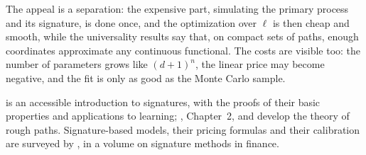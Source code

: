 
The appeal is a separation: the expensive part, simulating the primary process and its signature, is done once,
and the optimization over $\ell$ is then cheap and smooth, while the universality results say that, on compact
sets of paths, enough coordinates approximate any continuous functional. The costs are visible too: the number of parameters grows like
$(d+1)^n$, the linear price may become negative, and the fit is only as good as the Monte Carlo sample.

\furtherreading
\textcite{chevyrev-kormilitzin-primer} is an accessible introduction to signatures, with the proofs of their
basic properties and applications to learning; \textcite{lyons-caruana-levy-2007}, Chapter~2, and
\textcite{friz-victoir-2010} develop the theory of rough paths. Signature-based models, their pricing formulas
and their calibration are surveyed by \textcite{cuchiero-gazzani-moller-svaluto-ferro-2026}, in a volume on
signature methods in finance.
